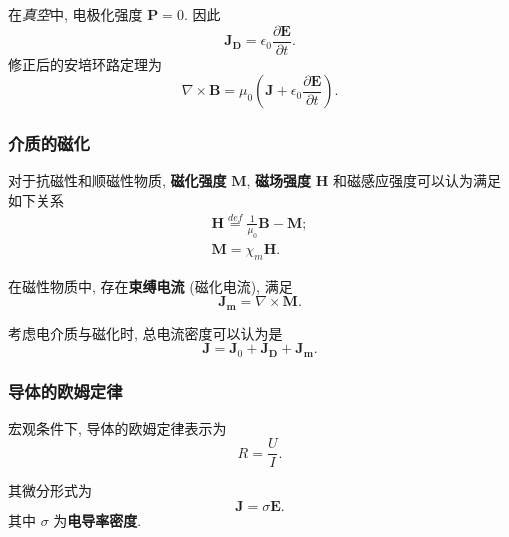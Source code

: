 在\textit{真空}中, 电极化强度 $\bm{P}=0$. 因此
\begin{equation}
    \bm{J_D}=\epsilon_0\frac{\partial\bm{E}}{\partial t}.
\end{equation}
修正后的安培环路定理为
\begin{equation}
    \nabla\times\bm{B}=\mu_0\left(\bm{J}+\epsilon_0\frac{\partial\bm{E}}{\partial t}\right).
\end{equation}

\subsubsection{介质的磁化}
对于抗磁性和顺磁性物质, \textbf{磁化强度} $\bm{M}$, \textbf{磁场强度} $\bm{H}$ 和磁感应强度可以认为满足如下关系
\begin{gather}
    \bm{H}\stackrel{def}{=}\frac{1}{\mu_0}\bm{B}-\bm{M}; \\
    \bm{M}=\chi_m\bm{H}.
\end{gather}

在磁性物质中, 存在\textbf{束缚电流} (磁化电流), 满足
\begin{equation}
    \bm{J_m}=\nabla\times\bm{M}.
\end{equation}

考虑电介质与磁化时, 总电流密度可以认为是
\begin{equation}
    \bm{J}=\bm{J}_0+\bm{J_D}+\bm{J_m}.
\end{equation}

\subsubsection{导体的欧姆定律}
宏观条件下, 导体的欧姆定律表示为
\begin{equation}
    R=\frac{U}{I}.
\end{equation}

其微分形式为
\begin{equation}
    \bm{J}=\sigma\bm{E}.
\end{equation}
其中 $\sigma$ 为\textbf{电导率密度}.
